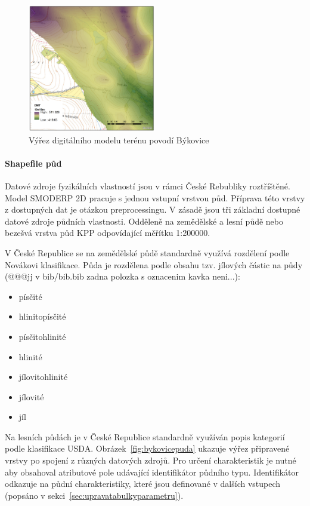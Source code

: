 \begin{figure}
  \centering
  \includegraphics[width=0.5\textwidth]{./img/DMT_byk.png}
  \caption{Výřez digitálního modelu terénu povodí Býkovice}
  \label{fig:bykovicedmt}
\end{figure}

 
\paragraph{Shapefile půd} \label{sec:vstuppuda}

Datové zdroje fyzikálních vlastností jsou v rámci České Rebubliky roztříštěné. Model SMODERP 2D pracuje s jednou vstupní vrstvou půd. Příprava této vrstvy z dostupných dat je otázkou preprocessingu. V zásadě jsou tři základní dostupné datové zdroje půdních vlastnosti. Odděleně na zemědělské a lesní půdě nebo bezešvá vrstva půd KPP odpovídající měřítku 1:200000.

V České Republice se na zemědělské půdě standardně využívá rozdělení podle Novákovi klasifikace. Půda je rozdělena podle obsahu tzv. jílových částic na půdy \cite{kavka} (@@@jj v bib/bib.bib zadna polozka s oznacenim kavka neni...):
\begin{itemize} \itemsep 0pt
  \item písčité
  \item hlinitopísčité
  \item písčitohlinité
  \item hlinité
  \item jílovitohlinité
  \item jílovité
  \item jíl
\end{itemize}

Na lesních půdách je v České Republice standardně využíván popis kategorií podle klasifikace USDA.
Obrázek~\ref{fig:bykovicepuda} ukazuje výřez připravené vrstvy po spojení z různých datových zdrojů. Pro určení charakteristik je nutné aby obsahoval atributové pole udávající identifikátor půdního typu. Identifikátor odkazuje na půdní charakteristiky, které jsou definované v dalších vstupech (popsáno v sekci~\ref{sec:upravatabulkyparametru}).


